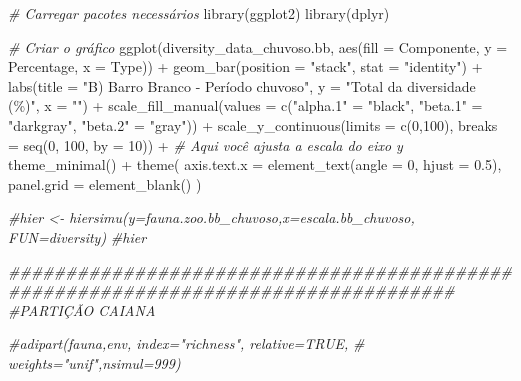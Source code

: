 \documentclass[
  letterpaper,
  DIV=11,
  numbers=noendperiod]{scrartcl}
\newenvironment{Shaded}{}{}
\newcommand{\AttributeTok}[1]{\textcolor[rgb]{0.49,0.56,0.16}{#1}}
\newcommand{\CommentTok}[1]{\textcolor[rgb]{0.38,0.63,0.69}{\textit{#1}}}
\newcommand{\DecValTok}[1]{\textcolor[rgb]{0.25,0.63,0.44}{#1}}
\newcommand{\DocumentationTok}[1]{\textcolor[rgb]{0.73,0.13,0.13}{\textit{#1}}}
\newcommand{\FloatTok}[1]{\textcolor[rgb]{0.25,0.63,0.44}{#1}}
\newcommand{\FunctionTok}[1]{\textcolor[rgb]{0.02,0.16,0.49}{#1}}
\newcommand{\NormalTok}[1]{#1}
\newcommand{\OtherTok}[1]{\textcolor[rgb]{0.00,0.44,0.13}{#1}}
\newcommand{\SpecialCharTok}[1]{\textcolor[rgb]{0.25,0.44,0.63}{#1}}
\newcommand{\StringTok}[1]{\textcolor[rgb]{0.25,0.44,0.63}{#1}}
\begin{document}
\begin{Shaded}
\begin{Highlighting}[numbers=left,,]
\CommentTok{\# Carregar pacotes necessários}
\FunctionTok{library}\NormalTok{(ggplot2)}
\FunctionTok{library}\NormalTok{(dplyr)}

\CommentTok{\# Criar o gráfico}
\FunctionTok{ggplot}\NormalTok{(diversity\_data\_chuvoso.bb, }\FunctionTok{aes}\NormalTok{(}\AttributeTok{fill =}\NormalTok{ Componente, }\AttributeTok{y =}\NormalTok{ Percentage, }\AttributeTok{x =}\NormalTok{ Type)) }\SpecialCharTok{+}
  \FunctionTok{geom\_bar}\NormalTok{(}\AttributeTok{position =} \StringTok{"stack"}\NormalTok{, }\AttributeTok{stat =} \StringTok{"identity"}\NormalTok{) }\SpecialCharTok{+}
  \FunctionTok{labs}\NormalTok{(}\AttributeTok{title =} \StringTok{"B) Barro Branco {-} Período chuvoso"}\NormalTok{,}
       \AttributeTok{y =} \StringTok{"Total da diversidade (\%)"}\NormalTok{,}
       \AttributeTok{x =} \StringTok{""}\NormalTok{) }\SpecialCharTok{+}
  \FunctionTok{scale\_fill\_manual}\NormalTok{(}\AttributeTok{values =} \FunctionTok{c}\NormalTok{(}\StringTok{"alpha.1"} \OtherTok{=} \StringTok{"black"}\NormalTok{,}
                               \StringTok{"beta.1"} \OtherTok{=} \StringTok{"darkgray"}\NormalTok{,}
                               \StringTok{"beta.2"} \OtherTok{=} \StringTok{"gray"}\NormalTok{)) }\SpecialCharTok{+}
  \FunctionTok{scale\_y\_continuous}\NormalTok{(}\AttributeTok{limits =} \FunctionTok{c}\NormalTok{(}\DecValTok{0}\NormalTok{,}\DecValTok{100}\NormalTok{), }\AttributeTok{breaks =} \FunctionTok{seq}\NormalTok{(}\DecValTok{0}\NormalTok{, }\DecValTok{100}\NormalTok{, }\AttributeTok{by =} \DecValTok{10}\NormalTok{)) }\SpecialCharTok{+} \CommentTok{\# Aqui você ajusta a escala do eixo y}
  \FunctionTok{theme\_minimal}\NormalTok{() }\SpecialCharTok{+}
  \FunctionTok{theme}\NormalTok{(}
    \AttributeTok{axis.text.x =} \FunctionTok{element\_text}\NormalTok{(}\AttributeTok{angle =} \DecValTok{0}\NormalTok{, }\AttributeTok{hjust =} \FloatTok{0.5}\NormalTok{),}
    \AttributeTok{panel.grid =} \FunctionTok{element\_blank}\NormalTok{()}
\NormalTok{  )}

\CommentTok{\#hier \textless{}{-} hiersimu(y=fauna.zoo.bb\_chuvoso,x=escala.bb\_chuvoso, FUN=diversity)}
\CommentTok{\#hier}

\DocumentationTok{\#\#\#\#\#\#\#\#\#\#\#\#\#\#\#\#\#\#\#\#\#\#\#\#\#\#\#\#\#\#\#\#\#\#\#\#\#\#\#\#\#\#\#\#\#\#\#\#\#\#\#\#\#\#\#\#\#\#\#\#\#\#\#\#\#\#\#\#\#\#\#\#\#\#\#\#\#\#\#\#\#\#\#}
\CommentTok{\#PARTIÇÃO CAIANA}

\CommentTok{\#adipart(fauna,env, index="richness", relative=TRUE,}
\CommentTok{\#        weights="unif",nsimul=999)}


\end{Highlighting}
\end{Shaded}
\end{document}
